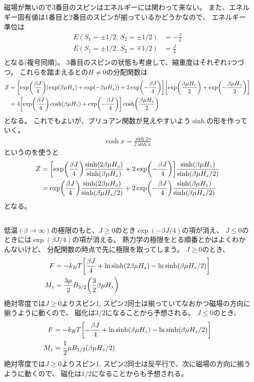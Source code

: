 \documentclass[../../master.tex]{subfiles}
\begin{document}
\subsection{}
磁場が無いので3番目のスピンはエネルギーには関わって来ない。
また、エネルギー固有値は1番目と2番目のスピンが揃っているかどうかなので、
エネルギー準位は
\begin{align}
    E(S_1=\pm 1/2,\,S_2=\pm 1/2) &= -\frac{J}{4}\\
    E(S_1=\pm 1/2,\,S_2=\mp 1/2) &= \frac{J}{4}\\
\end{align}
となる(複号同順)。
3番目のスピンの状態も考慮して、縮重度はそれぞれ4つづつ。
これらを踏まえるとの\(H\neq 0\)の分配関数は
\begin{align}
    Z
    &= \qty[\exp(\frac{\beta J}{4})\qty(\exp(\beta\mu H_z)+\exp(-\beta\mu H_z))
        +2\exp(-\frac{\beta J}{4})]
        \qty[\exp(\frac{\beta\mu H_z}{2})+\exp(-\frac{\beta\mu H_z}{2})]\\
    &= 4\qty[\exp(\frac{\beta J}{4})\cosh(\beta\mu H_z)
        +\exp(-\frac{\beta J}{4})]
        \cosh(\frac{\beta\mu H_z}{2})
\end{align}
となる。
これでもよいが、ブリュアン関数が見えやすいよう\(\sinh\)の形を作っていく。
\begin{align}
    \cosh x = \frac{\sinh 2x}{2\sinh x}
\end{align}
というのを使うと
\begin{align}
    Z &= \qty[\exp(\frac{\beta J}{4})\frac{\sinh(2\beta\mu H_z)}{\sinh(\beta\mu H_z)}
    +2\exp(-\frac{\beta J}{4})]
    \frac{\sinh(\beta\mu H_z)}{\sinh(\beta\mu H_z/2)}\\
    &=\exp(\frac{\beta J}{4})\frac{\sinh(2\beta\mu H_z)}{\sinh(\beta\mu H_z/2)}
        +2\exp(-\frac{\beta J}{4})\frac{\sinh(\beta\mu H_z)}{\sinh(\beta\mu H_z/2)}
\end{align}
となる。

\subsection{}
低温\((\beta\to \infty)\)の極限のもと、\(J \ge 0\)のとき\(\exp(-\beta J/4)\)の項が消え、
\(J \le 0\)のときには\(\exp(\beta J/4)\)の項が消える。
熱力学の極限をとる順番とかはよくわかんないけど、
分配関数の時点で先に極限を取ってしまう。
\(J\ge 0\)のとき、
\begin{align}
    F &= -k_BT \qty[
        \frac{\beta J}{4}
        + \ln\sinh(2\beta\mu H_z) - \ln\sinh(\beta\mu H_z/2)]\\
    M_z &= \frac{3\mu}{2} B_{3/2}\qty(\frac{3}{2}\beta\mu H_z)
\end{align}
絶対零度では\(J\ge0\)よりスピン1, スピン2同士は揃っていてなおかつ磁場の方向に揃うように動くので、
磁化は\(3/2\)になることから予想される。
\(J\le 0\)のとき、
\begin{align}
    F &= -k_BT \qty[
        -\frac{\beta J}{4}
        + \ln\sinh(\beta\mu H_z) - \ln\sinh(\beta\mu H_z/2)]\\
    M_z &= \frac{1}{2}\mu B_{1/2}(\beta\mu H_z/2)
\end{align}
絶対零度では\(J\ge0\)よりスピン1, スピン2同士は反平行で、次に磁場の方向に揃うように動くので、
磁化は\(1/2\)になることからも予想される。
\end{document}
